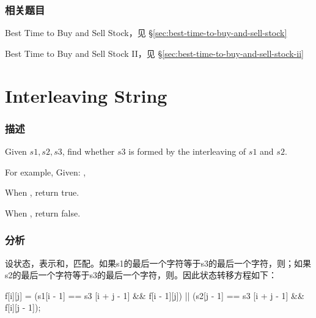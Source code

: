 \subsubsection{相关题目}
\begindot
\item Best Time to Buy and Sell Stock，见 \S \ref{sec:best-time-to-buy-and-sell-stock}
\item Best Time to Buy and Sell Stock II，见 \S \ref{sec:best-time-to-buy-and-sell-stock-ii}
\myenddot


\section{Interleaving String} %
\label{sec:interleaving-string}


\subsubsection{描述}
Given $s1, s2, s3$, find whether $s3$ is formed by the interleaving of $s1$ and $s2$.

For example, Given: ,

When , return true.

When , return false.


\subsubsection{分析}
设状态，表示和，匹配。如果s1的最后一个字符等于s3的最后一个字符，则；如果s2的最后一个字符等于s3的最后一个字符，则。因此状态转移方程如下：
\begin{Code}
f[i][j] = (s1[i - 1] == s3 [i + j - 1] && f[i - 1][j])
       || (s2[j - 1] == s3 [i + j - 1] && f[i][j - 1]);
\end{Code}


